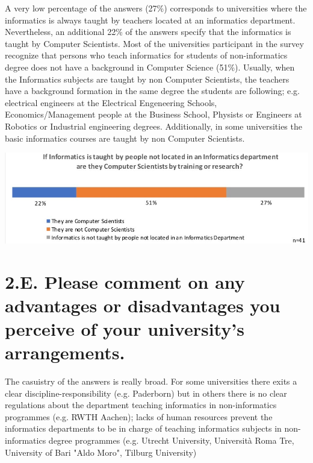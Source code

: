 A very low percentage of the answers (27\%) corresponds to universities where the informatics is always taught by teachers located at an informatics department. Nevertheless, an additional 22\% of the answers specify that the informatics is taught by Computer Scientists. Most of the universities participant in the survey recognize that persons who teach informatics for students of non-informatics degree does not have a background in Computer Science (51\%). Usually, when the Informatics subjects are  taught by non Computer Scientists, the teachers have a background formation in the same degree the students are following; e.g. electrical engineers at the Electrical Engeneering Schools, Economics/Management people at the Business School, Physists or Engineers at Robotics or Industrial engineering degrees. Additionally, in some universities the  basic informatics courses  are taught by non Computer Scientists.   





\includegraphics[width = \linewidth]{charts/2d.jpg}

\section{2.E. Please comment on any advantages or disadvantages you perceive of your university’s arrangements.}

The casuistry of the answers is really broad. For some universities there exits a clear discipline-responsibility (e.g. Paderborn) but in others there is no clear regulations about the department teaching informatics in non-informatics programmes (e.g. RWTH Aachen); lacks of human resources prevent the informatics departments to be in charge of teaching informatics subjects in non-informatics degree programmes (e.g. Utrecht University, Università Roma Tre, University of Bari "Aldo Moro",  Tilburg University)

